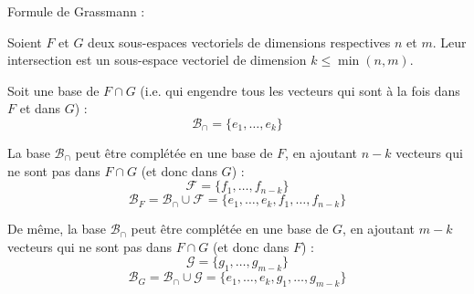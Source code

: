 \documentclass[10pt,a4paper]{article}
\begin{document}
\q Formule de Grassmann :

Soient $F$ et $G$ deux sous-espaces vectoriels de dimensions respectives $n$ et $m$. Leur
intersection est un sous-espace vectoriel de dimension $k \leq \min(n, m)$.

Soit une base de $F \cap G$ (i.e. qui engendre tous les vecteurs qui sont à la fois dans $F$ et dans
$G$) :
\[ \mathcal{B}_\cap = \{e_1, \ldots, e_k\} \]

La base $\mathcal{B}_\cap$ peut être complétée en une base de $F$, en ajoutant $n-k$ vecteurs qui ne
sont pas dans $F \cap G$ (et donc dans $G$) :
\[ \mathcal{F} = \{f_1, \ldots, f_{n-k}\} \]
\[ \mathcal{B}_F = \mathcal{B}_\cap \cup \mathcal{F} = \{e_1, \ldots, e_k, f_1, \ldots, f_{n-k}\} \]

De même, la base $\mathcal{B}_\cap$ peut être complétée en une base de $G$, en ajoutant $m-k$
vecteurs qui ne sont pas dans $F \cap G$ (et donc dans $F$) :
\[ \mathcal{G} = \{g_1, \ldots, g_{m-k}\} \]
\[ \mathcal{B}_G = \mathcal{B}_\cap \cup \mathcal{G} = \{e_1, \ldots, e_k, g_1, \ldots, g_{m-k}\} \]
\end{document}
